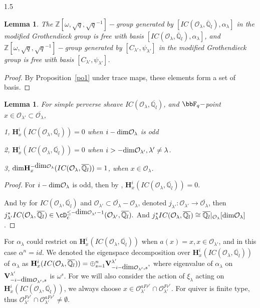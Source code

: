 \documentclass[10pt]{amsart}
\newtheorem{lemma}[theorem]{Lemma}
\def\dim{\mbox{\rm dim}}   \def\End{\mbox{\rm End}}
\def\bfV{{\mathbf V}}
\def\bfH{{\mathbf H}} \def\bfP{{\mathbf P}} \def\bfa{{\bf a}}
\def\bfV{\mathbf{V}}
\newcommand\bbq{{\mathbb Q}}
\newcommand\mo{{\mathcal{O}}}
\begin{document}
\begin{spacing}{1.5}
\begin{lemma}\label{lemma 1}
    The $\mathbb{Z}[\omega,\sqrt{q},\sqrt{q}^{-1}]-$group generated by $[IC(\mathcal{O}_{\lambda}, \overline{\mathbb{Q}}_l), \alpha_{\lambda}]$ in the modified Grothendieck group is free with basis $[IC(\mathcal{O}_{\lambda}, \overline{\mathbb{Q}}_l), \alpha_{\lambda}]$, and $\mathbb{Z}[\omega,\sqrt{q},\sqrt{q}^{-1}]-$group generated by $[C_{\lambda'}, \psi_{\lambda'}]$ in the modified Grothendieck group is free with basis $[C_{\lambda'}, \psi_{\lambda'}]$.
\end{lemma}
\begin{proof}
    By Proposition~\ref{po1} under trace maps, these elements form a set of basis.
\end{proof}
\begin{lemma}\label{lemma 2}
For simple perverse sheave $IC(\mo_{\lambda},\overline{\bbq_l})$, and $\bbF_q-$point $x\in \mo_{\lambda'}\subset \overline{\mo_{\lambda}}$, 

1, $\bfH^i_x(IC(\mo_{\lambda},\overline{\bbq_l}))=0$ when $i-\dim\mo_{\lambda}$ is odd

2, $\bfH^i_x(IC(\mo_{\lambda},\overline{\bbq_l}))=0$ when $i>-\dim\mo_{\lambda'}, \lambda'\not=\lambda$.

3, $\dim\bfH^{-\dim \mo_{\lambda}}_x(IC(\mo_{\lambda},\overline{\bbq_l}))=1$, when $x\in \mo_{\lambda}$.
\end{lemma}
\begin{proof}
For $i-\dim\mo_{\lambda}$ is odd, then by \cite[Corollary 10.7(a)]{lusztig1990canonical}, $\bfH^i_x(IC(\mo_{\lambda},\overline{\bbq_l}))=0$.

And by \cite[Lemma 3.3.11]{Pramod-2021} for $IC(\mo_{\lambda},\overline{\bbq_l})$ and $\mo_{\lambda'}\subset \overline{\mo_{\lambda}}-\mo_{\lambda}$, denoted $j_{\lambda'}:\mo_{\lambda'}\rightarrow \overline{\mo_{\lambda}}$, then $j_{\lambda'}^*IC(\mo_{\lambda},\overline{\bbq_l})\in \cD_c^{\leq-\dim\mo_{\lambda'}-1}(\mo_{\lambda'},\overline{\bbq_l}).$  And $j_{\lambda}^*IC(\mo_{\lambda},\overline{\bbq_l})\cong \overline{\bbq_l}|_{\mo_{\lambda}}[\dim\mo_{\lambda}]$.
\end{proof}
For $\alpha_{\lambda}$ could restrict on $\bfH^i_x(IC(\mo_{\lambda},\overline{\bbq_l}))$ when $a(x)=x, x\in \mo_{\lambda'}$, and in this case $\alpha^n=id$. We denoted the eigenspace decomposition over $\bfH^i_x(IC(\mo_{\lambda},\overline{\bbq_l}))$ of $\alpha_\lambda$ as $\bfH^i_x(IC(\mo_{\lambda},\overline{\bbq_l}))=\oplus_{s=1}^n \bfV_{-i-\dim\mo_{\lambda'},s}^{\lambda'},$ where eigenvalue of $\alpha_{\lambda}$ on $\bfV_{-i-\dim\mo_{\lambda'},s}^{\lambda'}$ is $\omega^s.$ For we will also consider the action of $\xi_{\lambda}$ acting on $\bfH^i_x(IC(\mo_{\lambda},\overline{\bbq_l}))$, we always choose $x\in \mo_{\lambda'}^{aFr^r}\cap \mo_{\lambda'}^{Fr^r}$. For quiver is finite type, thus $\mo_{\lambda'}^{Fr^r}\cap \mo_{\lambda'}^{aFr^r}\not=\emptyset.$


\end{spacing}
\end{document}
